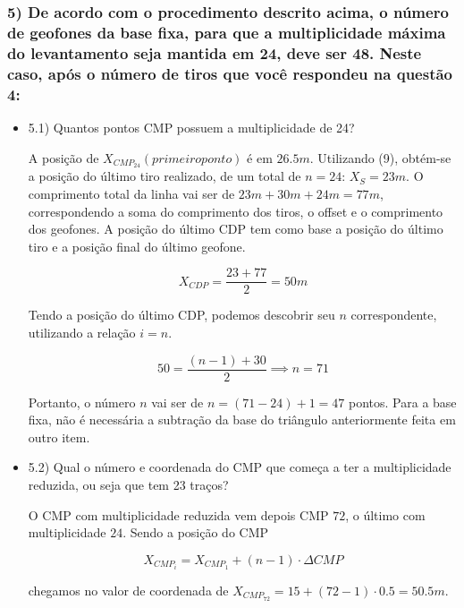 \documentclass[12pt,a4paper]{article}
\begin{document}
\subsubsection{5) De acordo com o procedimento descrito acima, o número de geofones da base fixa, para que a multiplicidade máxima do levantamento seja mantida em 24, deve ser 48. Neste caso, após o número de tiros que você respondeu na questão 4:}
    \begin{itemize}[leftmargin=1cm]
        \item 5.1) Quantos pontos CMP possuem a multiplicidade de 24?

        A posição de $X_{CMP_{24}} (primeiro ponto)$ é em $26.5m$. Utilizando (9), obtém-se a posição do último tiro realizado, de um total de $n=24$: $X_S = 23m$. O comprimento total da linha vai ser de $23m + 30m + 24m = 77m$, correspondendo a soma do comprimento dos tiros, o offset e o comprimento dos geofones. A posição do último CDP tem como base a posição do último tiro e a posição final do último geofone.

        $$ X_{CDP} = \frac{23 + 77}{2} = 50m $$

        Tendo a posição do último CDP, podemos descobrir seu $n$ correspondente, utilizando a relação $i = n$. 

        $$ 50 = \frac{(n-1) + 30}{2} \implies n = 71$$

        Portanto, o número $n$ vai ser de $n = (71-24) + 1 = 47$ pontos.  Para a base fixa, não é necessária a subtração da base do triângulo anteriormente feita em outro item. 


    
        
        \item 5.2) Qual o número e coordenada do CMP que começa a ter a multiplicidade reduzida, ou seja que tem 23 traços?

        O CMP com multiplicidade reduzida vem depois CMP $72$, o último com multiplicidade $24$. Sendo a posição do CMP 

        \begin{equation}
            X_{CMP_i} = X_{CMP_1} + (n-1) \cdot  \Delta CMP
        \end{equation}

        \noindent 
        chegamos no valor de coordenada de $X_{CMP_{72}} = 15 + (72-1) \cdot 0.5 = 50.5m$. 

        
        
    \end{itemize}
\end{document}
